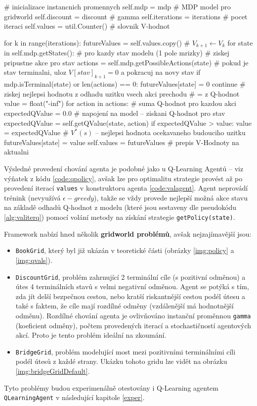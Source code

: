 \begin{python}[label={code:valagent}]
# inicializace instancnich promennych
self.mdp = mdp			# MDP model pro gridworld
self.discount = discount     # gamma
self.iterations = iterations # pocet iteraci
self.values = util.Counter() # slovnik V-hodnot

for k in range(iterations):
   futureValues = self.values.copy()   # $V_{k+1} \leftarrow V_k$
   for state in self.mdp.getStates():  # pro kazdy stav modelu (1 pole mrizky)
      # ziskej pripustne akce pro stav
      actions = self.mdp.getPossibleActions(state)
      # pokud je stav terminalni, uloz $V[stav]_{k+1} = 0$ a pokracuj na novy stav
      if mdp.isTerminal(state) or len(actions) == 0:
         futureValues[state] = 0
         continue
      # ziskej nejlepsi hodnotu z odhadu uzitku vsech akci prechodu
      # = z Q-hodnot
      value = float("-inf")
      for action in actions:
         # suma Q-hodnot pro kazdou akci
         expectedQValue = 0.0
         # napojení na model -- ziskani Q-hodnot pro stav
         expectedQValue = self.getQValue(state, action)
         if expectedQValue > value:
            value = expectedQValue
      # $V^*(s)$ -- nejlepsi hodnota ocekavaneho budouciho uzitku
      futureValues[state] = value
   self.values = futureValues # prepis V-Hodnoty na aktualni
\end{python}

Výsledné provedení chování agenta je podobné jako u Q-Learning Agentů -- viz výňatek z kódu \ref{code:qpolicy}, avšak lze pro optimalitu strategie provést až po provedení iterací \texttt{values} v konstruktoru agenta \ref{code:valagent}. Agent neprovádí trénink (nevyužívá $\epsilon-greedy$), takže se vždy provede nejlepší možná akce stavu na základě odhadů Q-hodnot z modelu (které jsou sestaveny dle pseudokódu \ref{alg:valiterq}) pomocí volání metody na získání strategie \texttt{getPolicy(state)}.

Framework nabízí hned několik \textbf{gridworld problémů}, avšak nejzajímavější jsou:
\begin{itemize}
  \item \texttt{BookGrid}, který byl již ukázán v teoretické části (obrázky \ref{img:policy} a \ref{img:qvals}).
  \item \texttt{DiscountGrid}, problém zahrnující 2 terminální cíle (s pozitivní odměnou) a útes 4 terminálních stavů s velmi negativní odměnou. Agent se potýká s tím, zda jít delší bezpečnou cestou, nebo kratší riskantnější cestou podél útesu a také s faktem, že cíle mají rozdílné odměny (vzdálenější má hodnotnější odměnu). Rozdílné chování agenta je ovlivňováno instanční proměnnou \texttt{gamma} (koeficient odměny), počtem provedených iterací a stochastičností agentových akcí. Proto je tento problém ideální na zkoumání.
  \item \texttt{BridgeGrid}, problém modelující most mezi pozitivními terminálními cíli podél útesů z každé strany. Ukázku tohoto gridu lze vidět na obrázku \ref{img:bridgeGridDefault}.
\end{itemize}
Tyto problémy budou experimenálně otestovány i Q-Learning agentem \texttt{QLearningAgent} v následující kapitole \ref{exper}.

